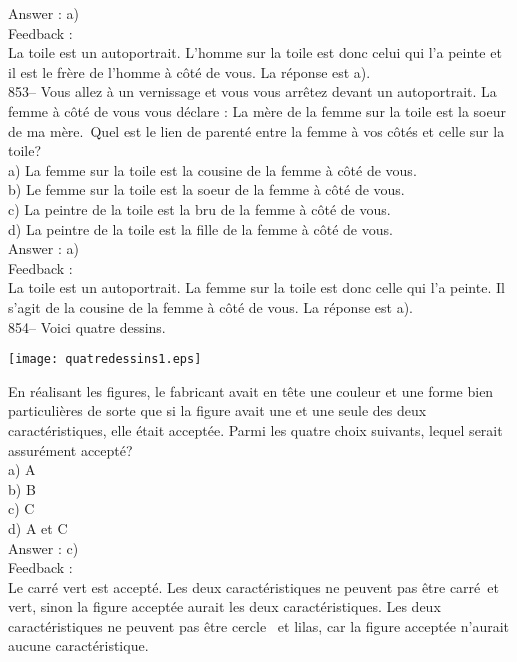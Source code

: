 \documentclass[letterpaper, 12pt]{article}
\begin{document}
Answer : a)\\

Feedback :\\
La toile est un autoportrait.  L'homme sur la toile est donc celui qui l'a
peinte et il est le fr\`ere de l'homme \`a c\^ot\'e de vous.  La r\'eponse
est a).\\

853-- Vous allez \`a un vernissage et vous vous arr\^etez devant un
autoportrait.  La femme \`a c\^ot\'e de vous vous d\'eclare : \og La
m\`ere de la femme sur la toile est la soeur de ma m\`ere.\fg\  Quel
est le lien de parent\'e entre la femme \`a vos c\^ot\'es et celle sur la toile?\\
a) La femme sur la toile est la cousine de la femme \`a c\^ot\'e de vous.\\
b) Le femme sur la toile est la soeur de la femme \`a c\^ot\'e de vous.\\
c) La peintre de la toile est la bru de la femme \`a c\^ot\'e de vous.\\
d) La peintre de la toile est la fille de la femme \`a c\^ot\'e de vous.\\

Answer : a)\\

Feedback : \\
La toile est un autoportrait.  La femme sur la toile est donc celle qui l'a
peinte.  Il s'agit de la cousine de la femme \`a c\^ot\'e de vous.  La
r\'eponse est a).\\

854-- Voici quatre dessins.
    \begin{center}
    \texttt{[image: quatredessins1.eps]}
    \end{center}

En r\'ealisant les figures, le fabricant avait en t\^ete une couleur et une
forme bien particuli\`eres de sorte que si la figure avait une et une seule
des deux caract\'eristiques, elle \'etait accept\'ee.  Parmi les quatre
choix suivants, lequel serait assur\'ement accept\'e?\\
a) A\\
b) B\\
c) C\\
d) A et C\\

Answer : c)\\

Feedback : \\
Le carr\'e vert est accept\'e.  Les deux caract\'eristiques ne
peuvent pas \^etre \og carr\'e\fg\ et \og vert\fg , sinon la figure
accept\'ee aurait les deux caract\'eristiques.  Les deux
caract\'eristiques ne peuvent pas \^etre \og cercle \fg\ et \og
lilas\fg , car la figure accept\'ee n'aurait aucune caract\'eristique. \\
\end{document}
